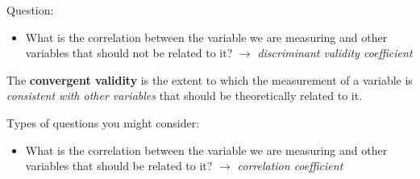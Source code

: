 \documentclass[
  11pt,
  a4paper,
  twoside,symmetric,openright]{book}
\providecommand{\tightlist}{%
  \setlength{\itemsep}{0pt}\setlength{\parskip}{0pt}}
\theoremstyle{break}
\theoremstyle{break}
\begin{document}
Question:

\begin{itemize}
\tightlist
\item
  What is the correlation between the variable we are measuring and other variables that should not be related to it? \(\rightarrow\) \emph{discriminant validity coefficient}
\end{itemize}

\begin{definition}
\protect\hypertarget{def:defconvergentvalidity}{}\label{def:defconvergentvalidity}The \textbf{convergent validity} is the extent to which the measurement of a variable is \emph{consistent with other variables} that should be theoretically related to it.
\end{definition}

Types of questions you might consider:

\begin{itemize}
\tightlist
\item
  What is the correlation between the variable we are measuring and other variables that should be related to it? \(\rightarrow\) \emph{correlation coefficient}
\end{itemize}
\end{document}
